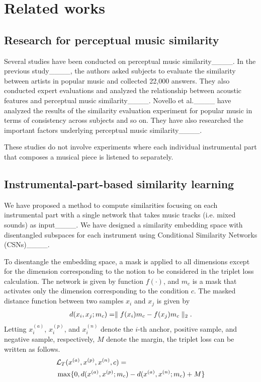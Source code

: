 \section{Related works}
\label{sec:related_works}

\subsection{Research for perceptual music similarity}
Several studies have been conducted on perceptual music similarity____. In the previous study____, the authors asked subjects to evaluate the similarity between artists in popular music and collected 22,000 answers. They also conducted expert evaluations and analyzed the relationship between acoustic features and perceptual music similarity____. Novello et al.____ have analyzed the results of the similarity evaluation experiment for popular music in terms of consistency across subjects and so on. They have also researched the important factors underlying perceptual music similarity____. 
\par
These studies do not involve experiments where each individual instrumental part that composes a musical piece is listened to separately.


\subsection{Instrumental-part-based similarity learning}
\label{disent}
We have proposed a method to compute similarities focusing on each instrumental part with a single network that takes music tracks (i.e. mixed sounds) as input____. We have designed a similarity embedding space with disentangled subspaces for each instrument using Conditional Similarity Networks (CSNs)____.
\par
To disentangle the embedding space, a mask is applied to all dimensions except for the dimension corresponding to the notion to be considered in the triplet loss calculation. The network is given by function $f(\cdot)$, and $m_c$ is a mask that activates only the dimension corresponding to the condition $c$. The masked distance function between two samples $x_i$ and $x_j$ is given by
\begin {align}
\label{CSNtriplet}
d(x_i,x_j;m_c)=\parallel f(x_i)m_c-f(x_j)m_c\parallel_2.
\vspace{-24pt}
\end{align}
Letting $x_i^{(a)}$, $x_i^{(p)}$, and $x_i^{(n)}$ denote the $i$-th anchor, positive sample, and negative sample, respectively, $M$ denote the margin, the triplet loss can be written as follows.
\begin {align}
 &\mathcal{L}_T(x^{(a)},x^{(p)},x^{(n)},c)=\notag \\
 &\max\{0,d(x^{(a)},x^{(p)};m_c)-d(x^{(a)},x^{(n)};m_c)+M\}
\end{align}
\vspace{-24pt}
\\

